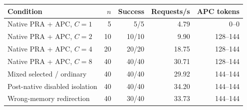\begin{tabular}{lrrrr}
\toprule
Condition & $n$ & Success & Requests/s & APC tokens \\
\midrule
Native PRA + APC, $C=1$ & 5 & 5/5 & 4.79 & 0--0 \\
Native PRA + APC, $C=2$ & 10 & 10/10 & 9.90 & 128--144 \\
Native PRA + APC, $C=4$ & 20 & 20/20 & 18.75 & 128--144 \\
Native PRA + APC, $C=8$ & 40 & 40/40 & 30.71 & 128--144 \\
Mixed selected / ordinary & 40 & 40/40 & 29.92 & 144--144 \\
Post-native disabled isolation & 40 & 40/40 & 34.20 & 144--144 \\
Wrong-memory redirection & 40 & 30/40 & 33.73 & 144--144 \\
\bottomrule
\end{tabular}
